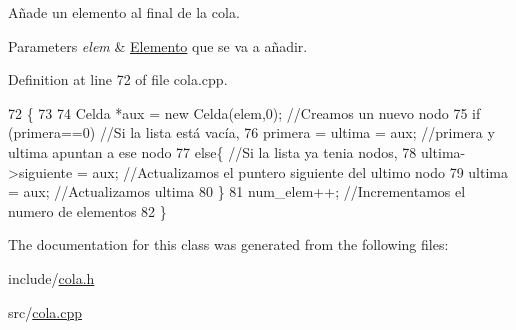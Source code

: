 Añade un elemento al final de la cola. 


\begin{DoxyParams}{Parameters}
{\em elem} & \hyperlink{structElemento}{Elemento} que se va a añadir. \\
\hline
\end{DoxyParams}


Definition at line 72 of file cola.\+cpp.


\begin{DoxyCode}
72                                  \{
73 
74   Celda *aux = \textcolor{keyword}{new} Celda(elem,0);    \textcolor{comment}{//Creamos un nuevo nodo}
75   \textcolor{keywordflow}{if} (primera==0)                    \textcolor{comment}{//Si la lista está vacía,}
76     primera = ultima = aux;          \textcolor{comment}{//primera y ultima apuntan a ese nodo}
77   \textcolor{keywordflow}{else}\{                      \textcolor{comment}{//Si la lista ya tenia nodos,}
78     ultima->siguiente = aux; \textcolor{comment}{//Actualizamos el puntero siguiente del ultimo nodo}
79     ultima = aux;            \textcolor{comment}{//Actualizamos ultima}
80   \}
81   num\_elem++;                \textcolor{comment}{//Incrementamos el numero de elementos}
82 \}
\end{DoxyCode}


The documentation for this class was generated from the following files\+:\begin{DoxyCompactItemize}
\item 
include/\hyperlink{cola_8h}{cola.\+h}\item 
src/\hyperlink{cola_8cpp}{cola.\+cpp}\end{DoxyCompactItemize}
